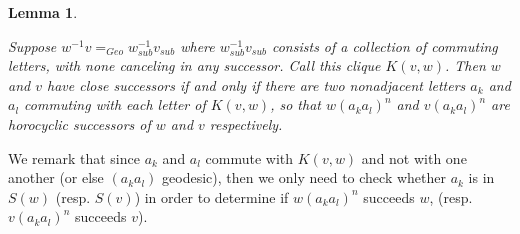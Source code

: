 \documentclass[10pt,a4paper]{amsart}
\newtheorem{lemma}[theorem]{Lemma}
\theoremstyle{definition}
\theoremstyle{remark}
\begin{document}
	\begin{lemma}\label{CliqueDifferenceAdjacency}
		
		Suppose $w^{-1}v=_{Geo}w_{sub}^{-1}v_{sub}$ where $w_{sub}^{-1}v_{sub}$ consists of a collection of commuting letters, with none canceling in any successor. Call this clique $K(v,w)$. Then $w$ and $v$ have close successors if and only if there are two nonadjacent letters $a_k$ and $a_l$ commuting with each letter of $K(v,w)$, so that $w(a_ka_l)^n$ and $v(a_ka_l)^n$ are horocyclic successors of $w$ and $v$ respectively.
		
	\end{lemma}
	
	We remark that since $a_k$ and $a_l$ commute with $K(v,w)$ and not with one another (or else $(a_ka_l)$ geodesic), then we only need to check whether $a_k$ is in $S(w)$  (resp. $S(v)$) in order to determine if $w(a_ka_l)^n$ succeeds $w$, (resp. $v(a_ka_l)^n$ succeeds $v$).
	
\end{document}
